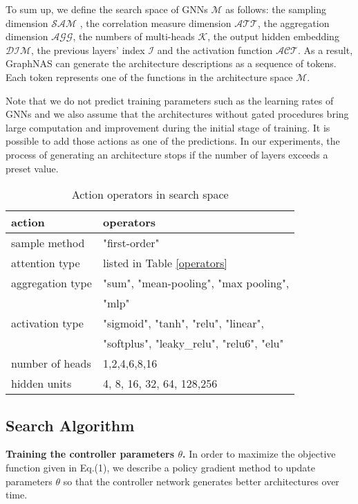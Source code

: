 \documentclass{article}
\begin{document}
To sum up, we define the search space of GNNs $\mathcal{M}$ as follows: the sampling dimension $\mathcal{SAM}$ , the correlation measure dimension $\mathcal{ATT}$, the aggregation dimension $\mathcal{AGG}$, the numbers of multi-heads $\mathcal{K}$, the output hidden embedding $\mathcal{DIM}$, the previous layers' index $\mathcal{I}$ and the activation function $\mathcal{ACT}$. As a result,  GraphNAS can generate the architecture descriptions as a sequence of tokens. Each token represents one of the functions in the architecture space $\mathcal{M}$. 

Note that we do not predict training parameters such as the learning rates of GNNs and we also assume that the architectures without gated procedures bring large computation and improvement during the initial stage of training. It is possible to add those actions as one of the predictions. In our experiments, the process of generating an architecture stops if the number of layers exceeds a preset value.

\begin{table}
	\caption{Action operators in search space}
	\label{actions}
	\begin{tabular}{l|l}
		\hline
		
		action            & operators  
        \\ \hline
        sample method & "first-order"    \\ \hline
		attention type    & listed in Table \ref{operators}      \\ \hline
		aggregation type & "sum", "mean-pooling", "max pooling", \\ & "mlp" \\  \hline
		activation type  & "sigmoid", "tanh", "relu", "linear",\\ &"softplus", "leaky\_relu", "relu6", "elu" \\ \hline
		number of heads & 1,2,4,6,8,16                                                                   \\ \hline
		hidden units     & 4, 8, 16, 32, 64, 128,256                                                         \\ \hline
	\end{tabular}
\end{table}

\subsection{Search Algorithm}
\label{Algorithms}
\textbf{Training the controller parameters $\theta$.}
In order to maximize the objective function given in Eq.(1), we describe a policy gradient method to update parameters $\theta$ so that the controller network generates better architectures over time.
\end{document}
